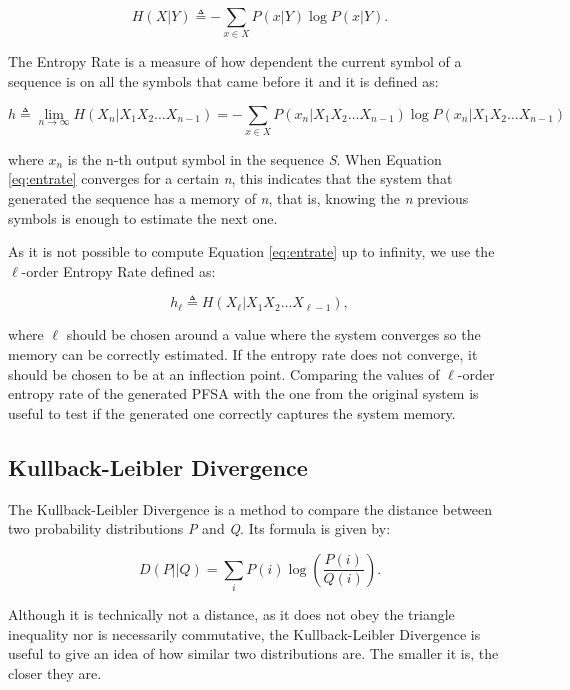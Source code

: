 {\begin{equation}
H(X|Y) \triangleq -\sum_{x\in X}P(x|Y)\log P(x|Y) . \label{eq:condent}
\end{equation}

The Entropy Rate is a measure of how dependent the current symbol of a sequence is on all the symbols that came before it and it is defined as:

\begin{equation}
h \triangleq \lim_{n\rightarrow\infty}H(X_n|X_1X_2\ldots X_{n-1}) = -\sum_{x\in X}P(x_n|X_1X_2\ldots X_{n-1})\log P(x_n|X_1X_2\ldots X_{n-1})  \label{eq:entrate}
\end{equation}

\noindent where $x_n$ is the n-th output symbol in the sequence \textit{S}. When Equation \ref{eq:entrate} converges for a certain \textit{n}, this indicates that the system that generated the sequence has a memory of \textit{n}, that is, knowing the \textit{n} previous symbols is enough to estimate the next one.

As it is not possible to compute Equation \ref{eq:entrate} up to infinity, we use the $\ell$-order Entropy Rate defined as:

\begin{equation}
h_{\ell} \triangleq H(X_{\ell}|X_1X_2\ldots X_{\ell-1}),   \label{eq:entratel}
\end{equation}

\noindent where $\ell$ should be chosen around a value where the system converges so the memory can be correctly estimated. If the entropy rate does not converge, it should be chosen to be at an inflection point. Comparing the values of $\ell$-order entropy rate of the generated PFSA with the one from the original system is useful to test if the generated one correctly captures the system memory.

\subsection{Kullback-Leibler Divergence}\label{sec:kld}

The Kullback-Leibler Divergence is a method to compare the distance between two probability distributions \textit{P} and \textit{Q}. Its formula is given by:

\begin{equation}
D(P||Q) = \sum_{i}P(i)\log(\frac{P(i)}{Q(i)}).	\label{eq:kld}
\end{equation}

Although it is technically not a distance, as it does not obey the triangle inequality nor is necessarily commutative, the Kullback-Leibler Divergence is useful to give an idea of how similar two distributions are. The smaller it is, the closer they are.

}
